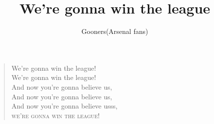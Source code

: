 \documentclass[a4paper,12pt]{article}
\title{We're gonna win the league}
\author{Gooners(Arsenal fans)}
\date{}
\begin{document}
	
	\maketitle
	
	\begin{verse}
		
		We're gonna win the league! \\
		We're gonna win the league! \\
		And now you're gonna believe us, \\
		And now you're gonna believe us, \\
		And now you're gonna believe usss, \\
		\scshape we're gonna win the league!
		
	\end{verse}
	
\end{document}
